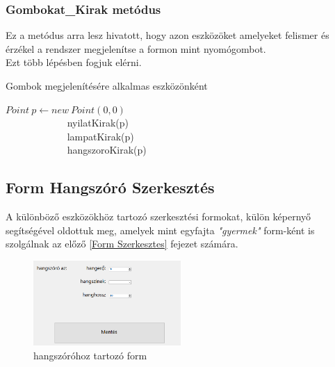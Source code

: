 \documentclass[tocnopagenum]{thesis-ekf}
\theoremstyle{definition}
\theoremstyle{remark}
\begin{document}
	\subsubsection{Gombokat\_Kirak metódus}
	Ez a metódus arra lesz hivatott, hogy azon eszközöket amelyeket felismer és érzékel a rendszer megjelenítse a formon mint nyomógombot.
	\\
	Ezt több lépésben fogjuk elérni.
	\begin{algorithm}
		
		\caption{Gombok megjelenítésére alkalmas eszközönként}\label{alg:cap}
		\begin{algorithmic}
			\State $Point \ p \gets new \  Point(0,0)$
					\\
					$\qquad \qquad \qquad $ nyilatKirak(p)
					\EndIf
						\\
					$\qquad \qquad  \qquad $ lampatKirak(p)
					\EndIf
						\\
					$\qquad \qquad \qquad $ hangszoroKirak(p)
					\EndIf
				\EndFor
			\EndFor
			\EndProcedure
		\end{algorithmic}
	\end{algorithm}

	\subsection{Form Hangszóró Szerkesztés}
	A különböző eszközökhöz tartozó szerkesztési formokat, külön képernyő segítségével oldottuk meg, amelyek mint egyfajta \textit{"gyermek"} form-ként is szolgálnak az előző \ref{Form Szerkesztes} fejezet számára.
	
	\begin{figure}[h!]	
	\centering
	\includegraphics[page=1,width=0.5\textwidth]{hangsz_form}
	\caption[Hangszoro form]{hangszóróhoz tartozó form}
	\label{fig:hangszform}
	\end{figure}
\end{document}
